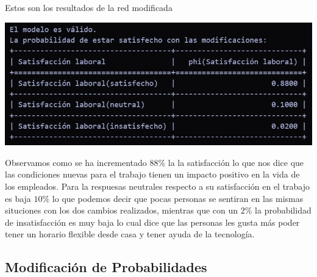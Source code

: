 Estos son los resultados de la red modificada 
\begin{center}
    \includegraphics[scale = .6]{IMA/ejecucionRedModificada.png}
\end{center}
Observamos como se ha incrementado $88\%$ la la satisfacción lo que nos dice que las condiciones 
nuevas para el trabajo tienen un impacto positivo en la vida de los empleados. Para la 
respuesas neutrales respecto a su satisfacción en el trabajo es baja $10\%$  lo que podemos 
decir que pocas personas se sentiran en las mismas situciones con los dos cambios realizados, 
mientras que con un $2\%$ la probabilidad de insatisfacción es muy baja lo cual dice que las 
personas les gusta más poder tener un horario flexible desde casa y tener ayuda de la 
tecnología.

\subsection{Modificación de Probabilidades}
